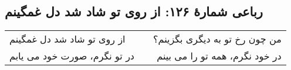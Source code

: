 \begin{center}
\section*{رباعی شمارهٔ ۱۲۶: از روی تو شاد شد دل غمگینم}
\label{sec:126}
\begin{longtable}{l p{0.5cm} r}
از روی تو شاد شد دل غمگینم
&&
من چون رخ تو به دیگری بگزینم؟
\\
در تو نگرم، صورت خود می یابم
&&
در خود نگرم، همه تو را می بینم
\\
\end{longtable}
\end{center}
